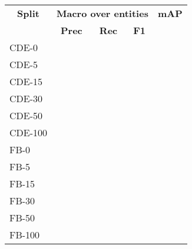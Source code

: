 \begin{tabular}{| l | r | r | r | r |}
    \hline

    \multicolumn{1}{|c|}{\textbf{Split}} &
    \multicolumn{3}{|c|}{\textbf{Macro over entities}} &
    \multicolumn{1}{|c|}{\textbf{mAP}} \\

    \multicolumn{1}{|c|}{} &
    \multicolumn{1}{|c|}{\textbf{Prec}} &
    \multicolumn{1}{|c|}{\textbf{Rec}} &
    \multicolumn{1}{|c|}{\textbf{F1}} &
    \multicolumn{1}{|c|}{} \\

    \hline \hline

    CDE-0   &  &  &  &  \\
    CDE-5   &  &  &  &  \\
    CDE-15  &  &  &  &  \\
    CDE-30  &  &  &  &  \\
    CDE-50  &  &  &  &  \\
    CDE-100 &  &  &  &  \\

    \hline

    FB-0    &  &  &  &  \\
    FB-5    &  &  &  &  \\
    FB-15   &  &  &  &  \\
    FB-30   &  &  &  &  \\
    FB-50   &  &  &  &  \\
    FB-100  &  &  &  &  \\

    \hline
\end{tabular}
